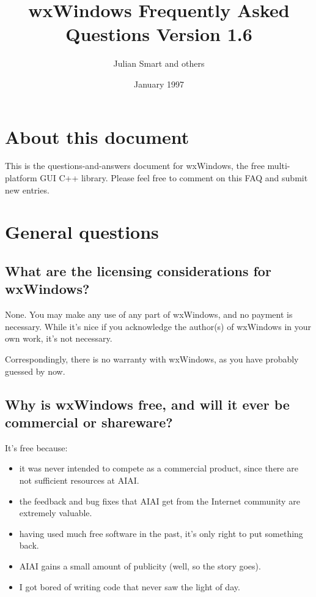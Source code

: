 %

\parskip=10pt
\parindent=0pt
\title{wxWindows Frequently Asked Questions Version 1.6}
\author{Julian Smart and others}
\date{January 1997}
\makeindex

\maketitle
\pagestyle{fancyplain}

\setfooter{\thepage}{}{}{}{}{\thepage}%
\tableofcontents
%
\chapter{About this document}
%
\setfooter{\thepage}{}{}{}{}{\thepage}%

This is the questions-and-answers document for wxWindows, the free multi-platform
GUI C++ library. Please feel free to comment on this FAQ and submit new entries.

\chapter{General questions}

\section{What are the licensing considerations for wxWindows?}

None. You may make any use of any part of wxWindows, and no payment is
necessary. While it's nice if you acknowledge the author(s) of wxWindows
in your own work, it's not necessary.

Correspondingly, there is no warranty with wxWindows, as you have probably
guessed by now.

\section{Why is wxWindows free, and will it ever be commercial or shareware?}

It's free because:

\begin{itemize}
\item it was never intended to compete as a commercial product, since
there are not sufficient resources at AIAI.
\item the feedback and bug fixes that AIAI get from the Internet community
are extremely valuable.
\item having used much free software in the past, it's only right
to put something back.
\item AIAI gains a small amount of publicity (well, so the story goes).
\item I got bored of writing code that never saw the light of day.
\end{itemize}

